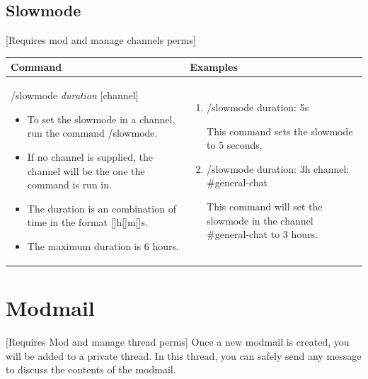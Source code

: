 \documentclass{scrartcl}
\begin{document}
\subsection{Slowmode} [Requires mod and manage channels perms]
\begin{tabularx}{\textwidth}{|>{\raggedright\arraybackslash}X|>{\raggedright\arraybackslash}X|}
\hline
Command & Examples\\
\hline
/slowmode \textit{duration} [channel]

\begin{itemize}
    \item To set the slowmode in a channel, run the command /slowmode.
    
    \item If no channel is supplied, the channel will be the one the command is run in.
    
    \item The duration is an combination of time in the format []h[]m[]s. 
    
    \item The maximum duration is 6 hours.
\end{itemize}
&
\begin{enumerate}
    \item /slowmode duration: \color{gray} 5s \color{black}
    
    This command sets the slowmode to 5 seconds. 
    
    \item /slowmode duration: \color{gray} 3h \color{black} channel: \color{gray} #general-chat \color{black}
    
    This command will set the slowmode in the channel #general-chat to 3 hours. 
\end{enumerate}\\
\hline

\end{tabularx}
\newpage
\section{Modmail} [Requires Mod and manage thread perms]
Once a new modmail is created, you will be added to a private thread. In this thread, you can safely send any message to discuss the contents of the modmail. 
\end{document}
